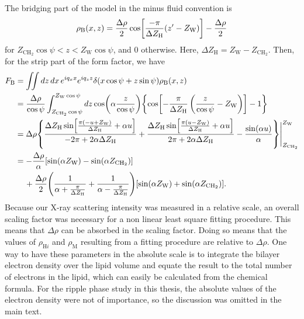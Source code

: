 \documentclass[12pt,letterpaper]{article}
\newcommand{\dx}{\mathop{dx}}
\newcommand{\dz}{\mathop{dz}}
\newcommand{\zw}{Z_\mathrm{W}}
\newcommand{\zchtwo}{Z_\mathrm{CH_2}}
\newcommand{\rhoh}[1]{\rho_{\mathrm{H}#1}}
\newcommand{\rhom}{\rho_\mathrm{M}}
\newcommand{\rhob}{\rho_\mathrm{B}}
\newcommand{\deltazh}{\Delta Z_\mathrm{H}}
\begin{document}
The bridging part of the model in the minus fluid convention is 
\begin{align}
  \rhob(x,z) = \frac{\Delta\rho}{2} \cos \bracks{
    \frac{-\pi}{\deltazh}(z'-\zw)} - \frac{\Delta\rho}{2}
\end{align}
for $\zchtwo\cos\psi < z < \zw\cos\psi$, and 0 otherwise. Here,
$\deltazh=\zw-\zchtwo$.
Then, for the strip part of the form factor, we have
\begin{align}
  F_\mathrm{B} 
  &= \iint\dz\dx e^{iq_xx}e^{iq_zz} \delta(x\cos\psi+z\sin\psi) \rhob(x,z) \nonumber\\
  &= \frac{\Delta\rho}{\cos\psi}
     \int_{\zchtwo\cos\psi}^{\zw\cos\psi}\dz \cos\pars{\alpha\frac{z}{\cos\psi}} 
     \braces{\cos\bracks{-\frac{\pi}{\deltazh}\left(\frac{z}{\cos\psi}-\zw\right)} - 1} \nonumber\\
  &= \Delta\rho \braces{
       \frac{\deltazh\sin\bracks{\frac{\pi(-u+\zw)}{\deltazh}+\alpha u}}{-2\pi+2\alpha\deltazh}
       + \frac{\deltazh\sin\bracks{\frac{\pi(u-\zw)}{\deltazh}+\alpha u}}{2\pi+2\alpha\deltazh}
       - \frac{\sin(\alpha u)}{\alpha}  
     }\Bigg|_{\zchtwo}^{\zw} \nonumber\\
  &= -\frac{\Delta\rho}{\alpha}\bracks{\sin(\alpha\zw)-\sin(\alpha\zchtwo)} \nonumber\\
  & \,\quad + \frac{\Delta\rho}{2} \pars{
      \frac{1}{\alpha+\frac{\pi}{\deltazh}} 
      + \frac{1}{\alpha-\frac{\pi}{\deltazh}}
    }\bracks{\sin(\alpha\zw)+\sin(\alpha\zchtwo)}.
\end{align}
Because our X-ray scattering intensity was measured in a relative scale, 
an overall scaling factor was necessary for a non linear least square 
fitting procedure. This means that $\Delta\rho$ can be absorbed in the 
scaling factor. Doing so means that the values of $\rhoh{i}$ and $\rhom$
resulting from a fitting procedure are relative to $\Delta\rho$. One way 
to have these parameters in the absolute scale is to integrate the 
bilayer electron density over the lipid volume and equate the result
to the total number of electrons in the lipid, which can easily be calculated
from the chemical formula. For the ripple phase study in this thesis, the
absolute values of the electron density were not of importance, so the
discussion was omitted in the main text.
\end{document}
